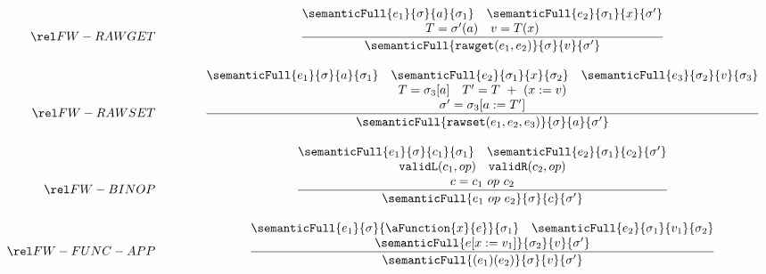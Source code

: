\begin{figure}[P]
\[\begin{array}{r@{\qquad\qquad}c}
\ssrule{FW-RAWGET}{
\semanticFull{e_1} {\sigma} {a} {\sigma_1} \quad
\semanticFull{e_2} {\sigma_1} {x} {\sigma'} \\
T = \sigma'(a)\quad
v = T(x)\\
}{
\semanticFull {{\tt rawget}(e_1,e_2)} {\sigma} {v} {\sigma'}
}
\ssrule{FW-RAWSET}{
\semanticFull{e_1}{\sigma}{a}{\sigma_1} \quad
\semanticFull{e_2}{\sigma_1}{x}{\sigma_2} \quad
\semanticFull{e_3}{\sigma_2}{v}{\sigma_3} \\
T = \sigma_3[a] \quad
T' = T~+~(x := v) \\
\sigma' = \sigma_3[a:=T']
}{
\semanticFull{{\tt rawset}(e_1,e_2,e_3)}{\sigma}{a}{\sigma'}
}
\ssrule{FW-BINOP}{
\semanticFull{e_1}{\sigma}{c_1}{\sigma_1} \quad
\semanticFull{e_2}{\sigma_1}{c_2}{\sigma'} \\
{\tt validL}(c_1, op) \quad
{\tt validR}(c_2, op) \\
c = c_1 ~op~ c_2
}{
\semanticFull{e_1 ~op~ e_2}{\sigma}{c}{\sigma'}
}
\ssrule{FW-FUNC-APP}{
\semanticFull{e_1}{\sigma}{\aFunction{x}{e}}{\sigma_1} \quad
\semanticFull{e_2}{\sigma_1}{v_1}{\sigma_2} \\
\semanticFull{e[x:=v_1]}{\sigma_2}{v}{\sigma'} 
}{
\semanticFull{(e_1)(e_2)}{\sigma}{v}{\sigma'} 
}
\end{array}
\]
\end{figure}


